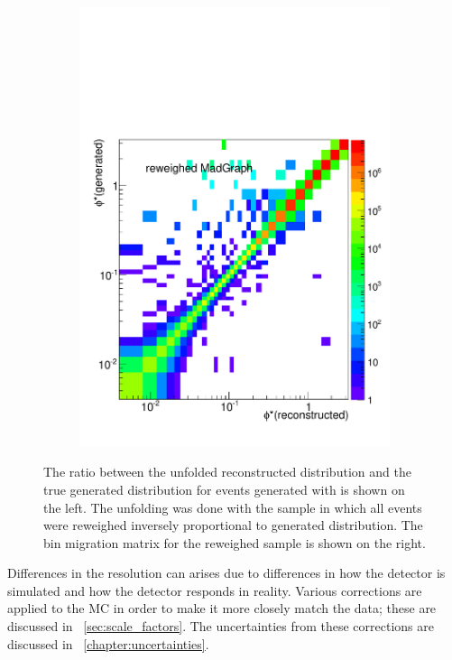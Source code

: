 \begin{figure}[!htbp]
\begin{subfigure}[b]{\SideBySidePlotWidth}
        \includegraphics[width=\textwidth]{figures/BinM_M_flat.pdf}
        \caption{}
        \label{fig:unfolding_flat_bin_migration}
    \end{subfigure}
    \caption{
        The ratio between the unfolded reconstructed \phistar distribution and
        the true generated \phistar distribution for \Ztoee events generated
        with \POWHEG is shown on the left. The unfolding was done with the
        \MADGRAPH sample in which all events were reweighed inversely
        proportional to generated \phistar distribution. The bin migration
        matrix for the reweighed \MADGRAPH sample is shown on the right.
    }
    \label{fig:flat_unfolding}
\end{figure}

Differences in the resolution can arises due to differences in how the
detector is simulated and how the detector responds in reality. Various
corrections are applied to the MC in order to make it more closely match the
data; these are discussed in \SEC~\ref{sec:scale_factors}. The uncertainties
from these corrections are discussed in \CHP~\ref{chapter:uncertainties}.

